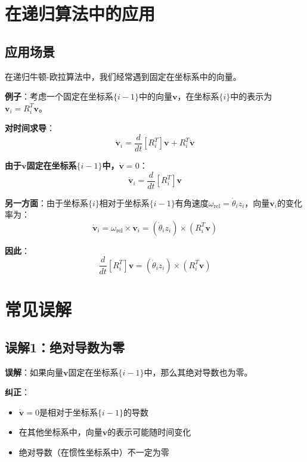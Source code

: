 \documentclass[12pt,a4paper]{article}
\begin{document}
\section{在递归算法中的应用}

\subsection{应用场景}

在递归牛顿-欧拉算法中，我们经常遇到固定在坐标系中的向量。

\textbf{例子}：考虑一个固定在坐标系$\{i-1\}$中的向量$\mathbf{v}$，在坐标系$\{i\}$中的表示为$\mathbf{v}_i = R_i^T \mathbf{v}$。

\textbf{对时间求导}：
\begin{equation}
\dot{\mathbf{v}}_i = \frac{d}{dt}[R_i^T] \mathbf{v} + R_i^T \dot{\mathbf{v}}
\end{equation}

\textbf{由于$\mathbf{v}$固定在坐标系$\{i-1\}$中，$\dot{\mathbf{v}} = 0$}：
\begin{equation}
\dot{\mathbf{v}}_i = \frac{d}{dt}[R_i^T] \mathbf{v}
\end{equation}

\textbf{另一方面}：由于坐标系$\{i\}$相对于坐标系$\{i-1\}$有角速度$\omega_{\text{rel}} = \dot{\theta}_i z_i$，向量$\mathbf{v}_i$的变化率为：
\begin{equation}
\dot{\mathbf{v}}_i = \omega_{\text{rel}} \times \mathbf{v}_i = (\dot{\theta}_i z_i) \times (R_i^T \mathbf{v})
\end{equation}

\textbf{因此}：
\begin{equation}
\frac{d}{dt}[R_i^T] \mathbf{v} = (\dot{\theta}_i z_i) \times (R_i^T \mathbf{v})
\end{equation}

\section{常见误解}

\subsection{误解1：绝对导数为零}

\textbf{误解}：如果向量$\mathbf{v}$固定在坐标系$\{i-1\}$中，那么其绝对导数也为零。

\textbf{纠正}：
\begin{itemize}
\item $\dot{\mathbf{v}} = 0$是相对于坐标系$\{i-1\}$的导数
\item 在其他坐标系中，向量$\mathbf{v}$的表示可能随时间变化
\item 绝对导数（在惯性坐标系中）不一定为零
\end{itemize}
\end{document}
